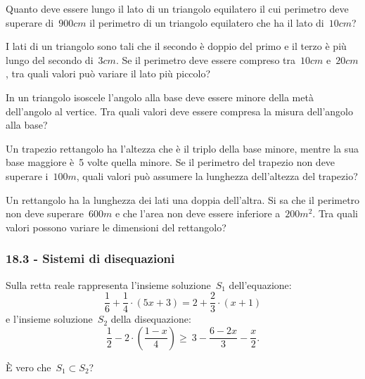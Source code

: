 \begin{multicols}{2}
 \begin{esercizio}[\Ast]
 \label{ese:18.30}
 Quanto deve essere lungo il lato di un triangolo equilatero il cui
perimetro deve superare di~$900\unit{cm}$ il perimetro di un triangolo
equilatero che ha il lato di~$10\unit{cm}$?
 \end{esercizio}

 \begin{esercizio}[\Ast]
 \label{ese:18.31}
 I lati di un triangolo sono tali che il secondo è doppio del primo e
il terzo è più lungo del secondo di~$3\unit{cm}$. Se il perimetro deve
essere compreso tra~$10\unit{cm}$ e~$20\unit{cm}$, tra quali valori può variare il lato
più piccolo?
 \end{esercizio}

 \begin{esercizio}[\Ast]
 \label{ese:18.32}
 In un triangolo isoscele l'angolo
alla base deve essere minore della metà dell'angolo
al vertice. Tra quali valori deve essere compresa la misura
dell'angolo alla base?
 \end{esercizio}

 \begin{esercizio}[\Ast]
 \label{ese:18.33}
 Un trapezio rettangolo ha l'altezza che è il triplo
della base minore, mentre la sua base maggiore è~5 volte quella minore.
Se il perimetro del trapezio non deve superare i~$100\unit{m}$, quali valori
può assumere la lunghezza dell'altezza del
trapezio?
 \end{esercizio}

 \begin{esercizio}[\Ast]
 \label{ese:18.34}
 Un rettangolo ha la lunghezza dei lati una doppia dell'altra.
Si sa che il perimetro non deve superare~$600\unit{m}$ e che
l'area non deve essere inferiore a~$200\unit{m^2}$. Tra quali
valori possono variare le dimensioni del rettangolo?
 \end{esercizio}
\end{multicols}

 \subsubsection*{18.3 - Sistemi di disequazioni}

\begin{esercizio}
 \label{ese:18.35}
Sulla retta reale rappresenta l'insieme soluzione~$S_{1}$
dell'equazione:
\[\frac{1}{6}+\frac{1}{4}\cdot (5x+3)=2+\frac{2}{3}\cdot (x+1)\]
e l'insieme soluzione~$S_{2}$ della disequazione:
\[\frac{1}{2}-2\cdot\left(\frac{1-x}{4}\right)\ge~3-\frac{6-2x}{3}-\frac{x}{2}.\]

È vero che~$S_{1}\subset S_{2}$?
\end{esercizio}

